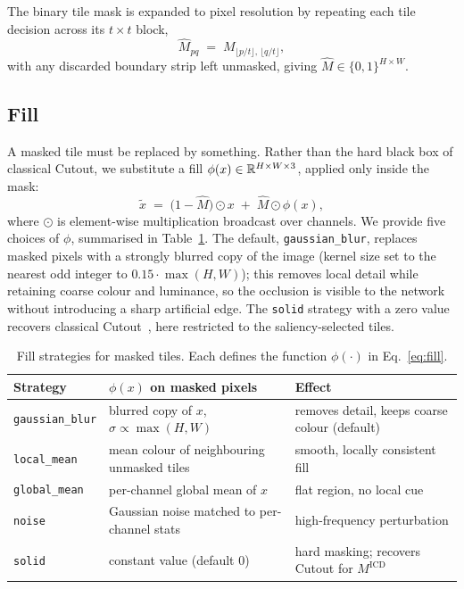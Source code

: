 The binary tile mask is expanded to pixel resolution by repeating each tile
decision across its $t \times t$ block,
\begin{equation}
  \widehat{M}_{pq} \;=\; M_{\lfloor p/t \rfloor,\, \lfloor q/t \rfloor},
  \label{eq:upsample}
\end{equation}
with any discarded boundary strip left unmasked, giving
$\widehat{M} \in \{0,1\}^{H \times W}$.

\subsection{Fill}
\label{sec:method:fill}

A masked tile must be replaced by something.  Rather than the hard black box of
classical Cutout, we substitute a fill $\phi(x) \in \mathbb{R}^{H \times W \times 3}$,
applied only inside the mask:
\begin{equation}
  \tilde{x}
  \;=\;
  \big(1 - \widehat{M}\big) \odot x
  \;+\;
  \widehat{M} \odot \phi(x),
  \label{eq:fill}
\end{equation}
where $\odot$ is element-wise multiplication broadcast over channels.  We
provide five choices of $\phi$, summarised in Table~\ref{tab:fills}.  The
default, \texttt{gaussian\_blur}, replaces masked pixels with a strongly blurred
copy of the image (kernel size set to the nearest odd integer to $0.15 \cdot
\max(H,W)$); this removes local detail while retaining coarse colour and
luminance, so the occlusion is visible to the network without introducing a
sharp artificial edge.  The \texttt{solid} strategy with a zero value recovers
classical Cutout~\citep{devries2017cutout}, here restricted to the
saliency-selected tiles.

\begin{table}[t]
\centering
\caption{Fill strategies for masked tiles.  Each defines the function
$\phi(\cdot)$ in Eq.~\eqref{eq:fill}.}
\label{tab:fills}
\small
\begin{tabular}{@{}lll@{}}
\toprule
Strategy & $\phi(x)$ on masked pixels & Effect \\
\midrule
\texttt{gaussian\_blur} & blurred copy of $x$, $\sigma \propto \max(H,W)$ & removes detail, keeps coarse colour (default) \\
\texttt{local\_mean}    & mean colour of neighbouring unmasked tiles      & smooth, locally consistent fill \\
\texttt{global\_mean}   & per-channel global mean of $x$                  & flat region, no local cue \\
\texttt{noise}          & Gaussian noise matched to per-channel stats     & high-frequency perturbation \\
\texttt{solid}          & constant value (default $0$)                    & hard masking; recovers Cutout for $M^{\mathrm{ICD}}$ \\
\bottomrule
\end{tabular}
\end{table}

